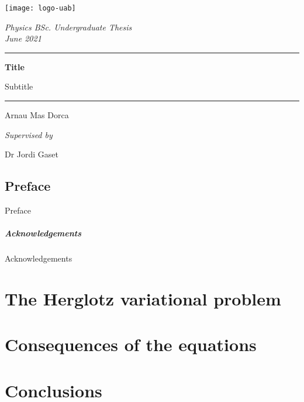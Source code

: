 \documentclass[12pt, oneside]{book}
\title{}
\author{Arnau Mas}
\date{}
\begin{document}
\begin{titlepage}
	\centering \sffamily

	\vspace*{2cm}

	\texttt{[image: logo-uab]}

	\vspace{2cm}

	{\Large \itshape Physics BSc. Undergraduate Thesis} \\
	{\large \itshape June 2021}

	\vspace{10pt}
	\hrule
	\vspace{10pt}
	{\bfseries \LARGE Title}

	{\Large Subtitle}
	\vspace{10pt}
	\hrule		
	\vspace{2cm}

	{\LARGE Arnau Mas Dorca}

	\vspace{1cm}
	{\large \itshape Supervised by}

	{\Large Dr Jordi Gaset}
\end{titlepage}
\thispagestyle{empty}

\pagestyle{plain}
\frontmatter
{\footnotesize \sffamily \tableofcontents}

\pagebreak
{}
\section*{Preface}
Preface

\paragraph{Acknowledgements}
Acknowledgements

\mainmatter
\pagestyle{main}

\chapter{The Herglotz variational problem}\label{ch:herglotz}


\chapter{}\label{ch:}


\chapter{Consequences of the equations}


\chapter{Conclusions}

\backmatter

\pagestyle{plain}
\printbibliography
\end{document}
